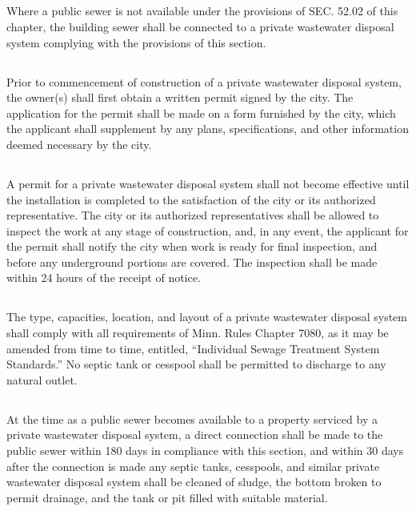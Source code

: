 \documentclass[code.tex]{subfiles}
\begin{document}
\subsection{}
Where a public sewer is not available under the provisions of SEC. 52.02 of this chapter, the building sewer shall be connected to a private wastewater disposal system complying with the provisions of this section.
\subsection{}
Prior to commencement of construction of a private wastewater disposal system, the owner(s) shall first obtain a written permit signed by the city.  The application for the permit shall be made on a form furnished by the city, which the applicant shall supplement by any plans, specifications, and other information deemed necessary by the city.
\subsection{}
A permit for a private wastewater disposal system shall not become effective until the installation is completed to the satisfaction of the city or its authorized representative.  The city or its authorized representatives shall be allowed to inspect the work at any stage of construction, and, in any event, the applicant for the permit shall notify the city when work is ready for final inspection, and before any underground portions are covered.  The inspection shall be made within 24 hours of the receipt of notice.
\subsection{}
The type, capacities, location, and layout of a private wastewater disposal system shall comply with all requirements of Minn. Rules Chapter 7080, as it may be amended from time to time, entitled, “Individual Sewage Treatment System Standards.” No septic tank or cesspool shall be permitted to discharge to any natural outlet.
\subsection{}
At the time as a public sewer becomes available to a property serviced by a private wastewater disposal system, a direct connection shall be made to the public sewer within 180 days in compliance with this section, and within 30 days after the connection is made any septic tanks, cesspools, and similar private wastewater disposal system shall be cleaned of sludge, the bottom broken to permit drainage, and the tank or pit filled with suitable material.
\end{document}
